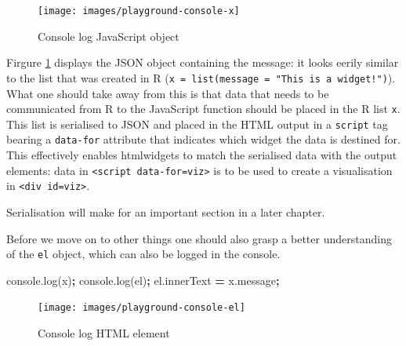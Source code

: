 \documentclass[10pt,]{krantz}
\makeatletter
\newenvironment{Shaded}{\begin{snugshade}}{\end{snugshade}}
\newcommand{\AttributeTok}[1]{\textcolor[rgb]{0.61,0.61,0.61}{#1}}
\newcommand{\NormalTok}[1]{#1}
\newcommand{\OperatorTok}[1]{\textcolor[rgb]{0.43,0.43,0.43}{\textbf{#1}}}
\newcommand{\VariableTok}[1]{\textcolor[rgb]{0,0,0}{#1}}
\newenvironment{kframe}{%
\medskip{}
\setlength{\fboxsep}{.8em}
 \def\at@end@of@kframe{}%
 \ifinner\ifhmode%
  \def\at@end@of@kframe{\end{minipage}}%
  \begin{minipage}{\columnwidth}%
 \fi\fi%
 \def\FrameCommand##1{\hskip\@totalleftmargin \hskip-\fboxsep
 \colorbox{shadecolor}{##1}\hskip-\fboxsep
     \hskip-\linewidth \hskip-\@totalleftmargin \hskip\columnwidth}%
 \MakeFramed {\advance\hsize-\width
   \@totalleftmargin\z@ \linewidth\hsize
   \@setminipage}}%
 {\par\unskip\endMakeFramed%
 \at@end@of@kframe}
\renewenvironment{Shaded}{\begin{kframe}}{\end{kframe}}
\newenvironment{rmdblock}[1]
  {
  \begin{itemize}
  \renewcommand{\labelitemi}{
    \raisebox{-.7\height}[0pt][0pt]{
      {\setkeys{Gin}{width=3em,keepaspectratio}\texttt{[image: images/\#1]}}
    }
  }
  \setlength{\fboxsep}{1em}
  \begin{kframe}
  \item
  }
  {
  \end{kframe}
  \end{itemize}
  }
\newenvironment{rmdnote}
  {\begin{rmdblock}{note}}
  {\end{rmdblock}}
\makeatother
\begin{document}
\begin{figure}[H]

{\centering \texttt{[image: images/playground-console-x]} 

}

\caption{Console log JavaScript object}\label{fig:playground-console}
\end{figure}

Firgure \ref{fig:playground-console} displays the JSON object containing the message: it looks eerily similar to the list that was created in R (\texttt{x\ =\ list(message\ =\ "This\ is\ a\ widget!")}). What one should take away from this is that data that needs to be communicated from R to the JavaScript function should be placed in the R list \texttt{x}. This list is serialised to JSON and placed in the HTML output in a \texttt{script} tag bearing a \texttt{data-for} attribute that indicates which widget the data is destined for. This effectively enables htmlwidgets to match the serialised data with the output elements: data in \texttt{\textless{}script\ data-for=\textquotesingle{}viz\textquotesingle{}\textgreater{}} is to be used to create a visualisation in \texttt{\textless{}div\ id=\textquotesingle{}viz\textquotesingle{}\textgreater{}}.

\begin{rmdnote}
Serialisation will make for an important section in a later chapter.
\end{rmdnote}

Before we move on to other things one should also grasp a better understanding of the \texttt{el} object, which can also be logged in the console.

\begin{Shaded}
\begin{Highlighting}[]
\VariableTok{console}\NormalTok{.}\AttributeTok{log}\NormalTok{(x)}\OperatorTok{;}
\VariableTok{console}\NormalTok{.}\AttributeTok{log}\NormalTok{(el)}\OperatorTok{;}
\VariableTok{el}\NormalTok{.}\AttributeTok{innerText} \OperatorTok{=} \VariableTok{x}\NormalTok{.}\AttributeTok{message}\OperatorTok{;}
\end{Highlighting}
\end{Shaded}

\begin{figure}[H]

{\centering \texttt{[image: images/playground-console-el]} 

}

\caption{Console log HTML element}\label{fig:playground-console-el}
\end{figure}
\end{document}
